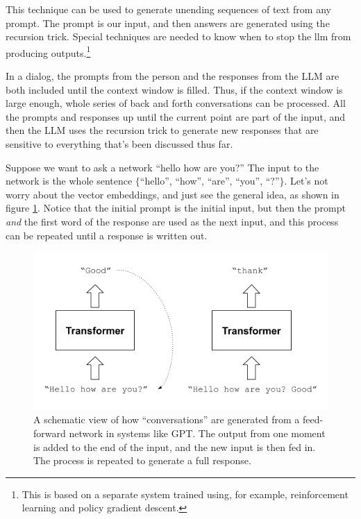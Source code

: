 This technique can be used to generate unending sequences of text from any prompt. The prompt is our input, and then answers are generated using the recursion trick. Special techniques are needed to know when to stop the llm from producing outputs.\footnote{This is based on a separate system trained using, for example, reinforcement learning and policy gradient descent.} 

In a dialog, the prompts from the person and the responses from the LLM are both included until the context window is filled. Thus, if the context window is large enough, whole series of back and forth conversations can be processed.  All the prompts and responses up until the current point are part of the input, and then the LLM uses the recursion trick to generate new responses that are sensitive to everything that's been discussed thus far.

Suppose we want to ask a network ``hello how are you?'' The input to the network is the whole sentence $\{$``hello'', ``how'', ``are'', ``you'', ``?''$\}$. Let's  not worry about the vector embeddings, and just see the general idea, as shown in figure \ref{gptRecursedInputs}. Notice that the initial prompt is the initial input, but then the prompt \emph{and} the first word of the response are used as the next input, and this process can be repeated until a response is written out.
  
\begin{figure}[h]
\centering
\includegraphics[scale=.7]{./images/gptRecursedInputs.png}
\caption[Jeff Yoshimi]{A schematic view of how ``conversations'' are generated from a feed-forward network in systems like GPT. The output from one moment is added to the end of the input, and the new input is then fed in. The process is repeated to generate a full response.}
\label{gptRecursedInputs}
\end{figure}

